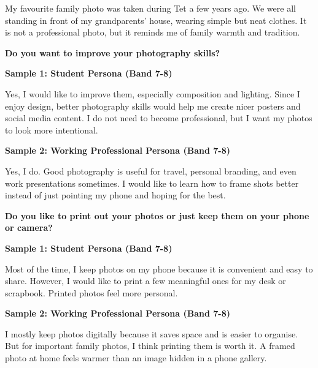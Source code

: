 My favourite family photo was taken during Tet a few years ago. We were all standing in front of my grandparents' house, wearing simple but neat clothes. It is not a professional photo, but it reminds me of family warmth and tradition.

\separator

\begin{ieltsquestion}
\textbf{Do you want to improve your photography skills?}
\end{ieltsquestion}
\textbf{Sample 1: Student Persona (Band 7-8)}

Yes, I would like to improve them, especially composition and lighting. Since I enjoy design, better photography skills would help me create nicer posters and social media content. I do not need to become professional, but I want my photos to look more intentional.

\textbf{Sample 2: Working Professional Persona (Band 7-8)}

Yes, I do. Good photography is useful for travel, personal branding, and even work presentations sometimes. I would like to learn how to frame shots better instead of just pointing my phone and hoping for the best.

\separator

\begin{ieltsquestion}
\textbf{Do you like to print out your photos or just keep them on your phone or camera?}
\end{ieltsquestion}
\textbf{Sample 1: Student Persona (Band 7-8)}

Most of the time, I keep photos on my phone because it is convenient and easy to share. However, I would like to print a few meaningful ones for my desk or scrapbook. Printed photos feel more personal.

\textbf{Sample 2: Working Professional Persona (Band 7-8)}

I mostly keep photos digitally because it saves space and is easier to organise. But for important family photos, I think printing them is worth it. A framed photo at home feels warmer than an image hidden in a phone gallery.

\separator


